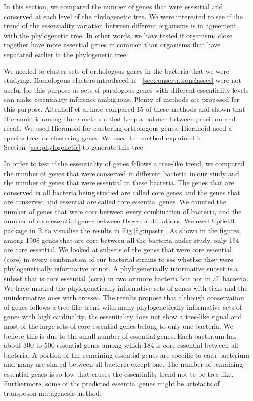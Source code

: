 \documentclass[12pt,letterpaper]{article}
\begin{document}
In this section, we compared the number of genes that were essential and conserved at each level of the phylogenetic tree. We were interested to see if the trend of the essentiality variation between different organisms is in agreement with the phylogenetic tree. In other words, we have tested if organisms close together have more essential genes in common than organisms that have separated earlier in the phylogenetic tree.

We needed to cluster sets of orthologous genes in the bacteria that we were studying. Homologous clusters introduced in ~\ref{sec:conservationclasses} were not useful for this purpose as sets of paralogous genes with different essentiality levels can make essentiality inference ambiguous. Plenty of methods are proposed for this purpose. Altenhoff et al.\@ have compared 15 of these methods \cite{altenhoff_standardized_2016} and shown that Hieranoid \cite{schreiber_hieranoid:_2013} is among three methods that keep a balance between precision and recall. We used Hieranoid for clustering orthologous genes. Hieranoid need a species tree for clustering genes. We used the method explained in Section~\ref{sec:phylogenetic} to generate this tree.

In order to test if the essentiality of genes follows a tree-like trend, we compared the number of genes that were conserved in different bacteria in our study and the number of genes that were essential in these bacteria. The genes that are conserved in all bacteria being studied are called core genes and the genes that are conserved and essential are called core essential genes. We counted the number of genes that were core between every combination of bacteria, and the number of core essential genes between those combinations. We used UpSetR package \cite{conway_upsetr:_2016} in R to visualise the results in Fig.\@ \ref{fig:upsetr}. As shown in the figures, among 1908 genes that are core between all the bacteria under study, only 184 are core essential. We looked at subsets of the genes that were core essential (core) in every combination of our bacterial strains to see whether they were phylogenetically informative or not. A phylogenetically informative subset is a subset that is core essential (core) in two or more bacteria but not in all bacteria. We have marked the phylogenetically informative sets of genes with ticks and the uninformative ones with crosses. The results propose that although conservation of genes follows a tree-like trend with many phylogenetically informative sets of genes with high cardinality, the essentiality does not show a tree-like signal and most of the large sets of core essential genes belong to only one bacteria. We believe this is due to the small number of essential genes. Each bacterium has about 300 to 500 essential genes among which 184 is core essential between all bacteria. A portion of the remaining essential genes are specific to each bacterium and many are shared between all bacteria except one. The number of remaining essential genes is so low that causes the essentiality trend not to be tree-like. Furthermore, some of the predicted essential genes might be artefacts of transposon mutagenesis method.
\end{document}

